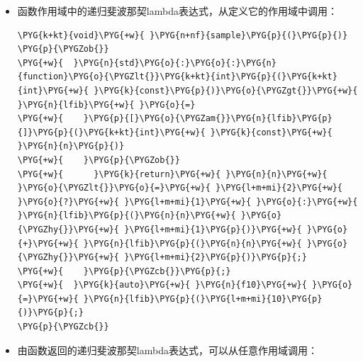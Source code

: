 \begin{itemize}
\item 函数作用域中的递归斐波那契lambda表达式，从定义它的作用域中调用：



\begin{codeblockbg}
\begin{Verbatim}[commandchars=\\\{\},breaklines=true,breakanywhere=true,fontsize=\codefont,xleftmargin=17bp]
\PYG{k+kt}{void}\PYG{+w}{ }\PYG{n+nf}{sample}\PYG{p}{(}\PYG{p}{)}
\PYG{p}{\PYGZob{}}
\PYG{+w}{  }\PYG{n}{std}\PYG{o}{:}\PYG{o}{:}\PYG{n}{function}\PYG{o}{\PYGZlt{}}\PYG{k+kt}{int}\PYG{p}{(}\PYG{k+kt}{int}\PYG{+w}{ }\PYG{k}{const}\PYG{p}{)}\PYG{o}{\PYGZgt{}}\PYG{+w}{ }\PYG{n}{lfib}\PYG{+w}{ }\PYG{o}{=}
\PYG{+w}{    }\PYG{p}{[}\PYG{o}{\PYGZam{}}\PYG{n}{lfib}\PYG{p}{]}\PYG{p}{(}\PYG{k+kt}{int}\PYG{+w}{ }\PYG{k}{const}\PYG{+w}{ }\PYG{n}{n}\PYG{p}{)}
\PYG{+w}{    }\PYG{p}{\PYGZob{}}
\PYG{+w}{      }\PYG{k}{return}\PYG{+w}{ }\PYG{n}{n}\PYG{+w}{ }\PYG{o}{\PYGZlt{}}\PYG{o}{=}\PYG{+w}{ }\PYG{l+m+mi}{2}\PYG{+w}{ }\PYG{o}{?}\PYG{+w}{ }\PYG{l+m+mi}{1}\PYG{+w}{ }\PYG{o}{:}\PYG{+w}{ }\PYG{n}{lfib}\PYG{p}{(}\PYG{n}{n}\PYG{+w}{ }\PYG{o}{\PYGZhy{}}\PYG{+w}{ }\PYG{l+m+mi}{1}\PYG{p}{)}\PYG{+w}{ }\PYG{o}{+}\PYG{+w}{ }\PYG{n}{lfib}\PYG{p}{(}\PYG{n}{n}\PYG{+w}{ }\PYG{o}{\PYGZhy{}}\PYG{+w}{ }\PYG{l+m+mi}{2}\PYG{p}{)}\PYG{p}{;}
\PYG{+w}{    }\PYG{p}{\PYGZcb{}}\PYG{p}{;}
\PYG{+w}{  }\PYG{k}{auto}\PYG{+w}{ }\PYG{n}{f10}\PYG{+w}{ }\PYG{o}{=}\PYG{+w}{ }\PYG{n}{lfib}\PYG{p}{(}\PYG{l+m+mi}{10}\PYG{p}{)}\PYG{p}{;}
\PYG{p}{\PYGZcb{}}
\end{Verbatim}
\end{codeblockbg}



\item 由函数返回的递归斐波那契lambda表达式，可以从任意作用域调用：




\end{itemize}
